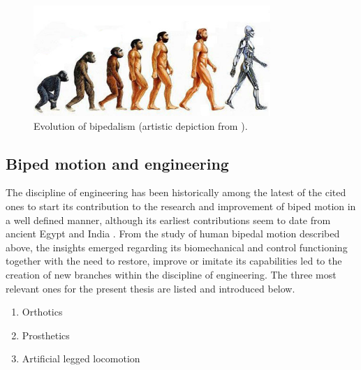 \begin{figure}[htb]
	\centering
	\includegraphics[width=0.8\textwidth]{figures/artificialhumans.jpg}
	\caption{Evolution of bipedalism (artistic depiction from \cite{human_evol_fig}).}
	\label{fig:biped_evolution}
\end{figure}

\subsection{Biped motion and engineering} %
\label{sub:bipedalism_and_engineering}
The discipline of engineering has been historically among the latest of the cited ones to start its contribution to the research and improvement of biped motion in a well defined manner, although its earliest contributions seem to date from ancient Egypt and India \cite{prosthetics_history}.
From the study of human bipedal motion described above, the insights emerged regarding its biomechanical and control functioning together with the need to restore, improve or imitate its capabilities led to the creation of new branches within the discipline of engineering.
The three most relevant ones for the present thesis are listed and introduced below.

\begin{enumerate}
	\item Orthotics
	\item Prosthetics
	\item Artificial legged locomotion 
\end{enumerate}

